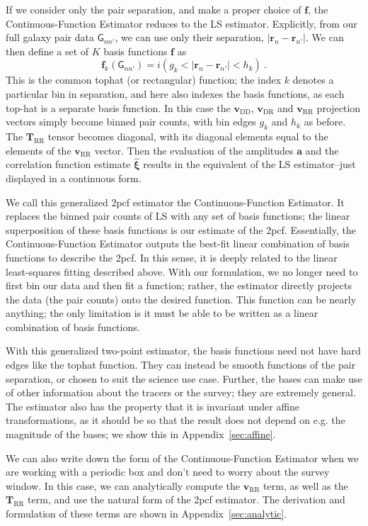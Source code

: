 \documentclass[modern]{aastex62}
\newcommand{\cf}{2pcf\xspace}
\newcommand{\est}{the Continuous-Function Estimator\xspace}
\newcommand{\LS}{LS\xspace}
\newcommand{\bld}[1]{\bm{#1}}
\newcommand{\vv}[1]{\bld{v}_\mathrm{#1}}
\newcommand{\TT}[1]{\bld{T}_\mathrm{#1}}
\newcommand{\ff}{\bld{f}}
\newcommand{\GG}[1]{\mathsf{G}_{#1}}
\begin{document}
If we consider only the pair separation, and make a proper choice of $\ff$, \est reduces to the \LS estimator.
Explicitly, from our full galaxy pair data $\GG{n n'}$, we can use only their separation,  $|\bld{r}_n - \bld{r}_{n'}|$.
We can then define a set of $K$ basis functions $\ff$ as
\begin{equation}
    \label{eq:ff_separation}
    \ff_k(\GG{n n'}) =  i(g_k < |\bld{r}_n - \bld{r}_{n'}| < h_k) ~.
\end{equation}
This is the common tophat (or rectangular) function; the index $k$ denotes a particular bin in separation, and here also indexes the basis functions, as each top-hat is a separate basis function.
In this case the $\vv{DD}$, $\vv{DR}$ and $\vv{RR}$ projection vectors simply become binned pair counts, with bin edges $g_k$ and $h_k$ as before.
The $\TT{RR}$ tensor becomes diagonal, with its diagonal elements equal to the elements of the $\vv{RR}$ vector.
Then the evaluation of the amplitudes $\bld{a}$ and the correlation function estimate $\bld{\hat{\xi}}$ results in the equivalent of the \LS estimator--just displayed in a continuous form.

We call this generalized \cf estimator \est.
It replaces the binned pair counts of \LS with any set of basis functions; the linear superposition of these basis functions is our estimate of the \cf.
Essentially, \est outputs the best-fit linear combination of basis functions to describe the \cf.
In this sense, it is deeply related to the linear least-squares fitting described above.
With our formulation, we no longer need to first bin our data and then fit a function; rather, the estimator directly projects the data (the pair counts) onto the desired function.
This function can be nearly anything; the only limitation is it must be able to be written as a linear combination of basis functions.

With this generalized two-point estimator, the basis functions need not have hard edges like the tophat function.
They can instead be smooth functions of the pair separation, or chosen to suit the science use case.
Further, the bases can make use of other information about the tracers or the survey; they are extremely general.
The estimator also has the property that it is invariant under affine transformations, as it should be so that the result does not depend on e.g. the magnitude of the bases; we show this in Appendix~\ref{sec:affine}.

We can also write down the form of \est when we are working with a periodic box and don't need to worry about the survey window.
In this case, we can analytically compute the $\vv{RR}$ term, as well as the $\TT{RR}$ term, and use the natural form of the \cf estimator.
The derivation and formulation of these terms are shown in Appendix~\ref{sec:analytic}.
\end{document}
